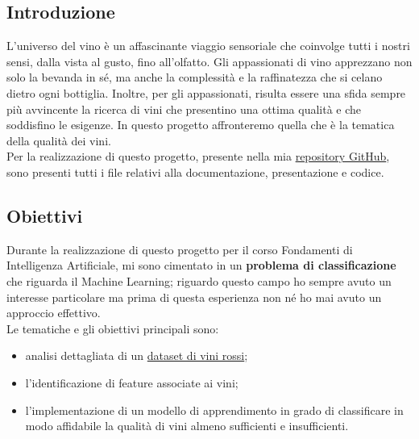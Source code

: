 \documentclass{article}
\begin{document}
\begin{titlepage}
        \section{Introduzione}
            L'universo del vino è un affascinante viaggio sensoriale che coinvolge tutti i nostri sensi, dalla vista al gusto, fino all'olfatto. Gli appassionati di vino apprezzano non solo la bevanda in sé, ma anche la complessità e la raffinatezza che si celano dietro ogni bottiglia. Inoltre, per gli appassionati, risulta essere una sfida sempre più avvincente la ricerca di vini che presentino una ottima qualità e che soddisfino le esigenze. In questo progetto affronteremo quella che è la tematica della qualità dei vini.\\
            Per la realizzazione di questo progetto, presente nella mia \href{https://github.com/bafiuss/SaporeDiVino.git}{repository GitHub}, sono presenti tutti i file relativi alla documentazione, presentazione e codice. 

        
        \subsection{Obiettivi}
            Durante la realizzazione di questo progetto per il corso Fondamenti di Intelligenza Artificiale, mi sono cimentato in un \textbf{problema di classificazione} che riguarda il Machine Learning; riguardo questo campo ho sempre avuto un interesse particolare ma prima di questa esperienza non né ho mai avuto un approccio effettivo. \\
            Le tematiche e gli obiettivi principali sono:
             \begin{itemize}
                \item analisi dettagliata di un \href{https://www.kaggle.com/datasets/uciml/red-wine-quality-cortez-et-al-2009}{dataset di vini rossi};
                \item l'identificazione di feature associate ai vini;
                \item l'implementazione di un modello di apprendimento in grado di classificare in modo affidabile la qualità di vini almeno sufficienti e insufficienti.
            \end{itemize}
            

\end{titlepage}
\end{document}
